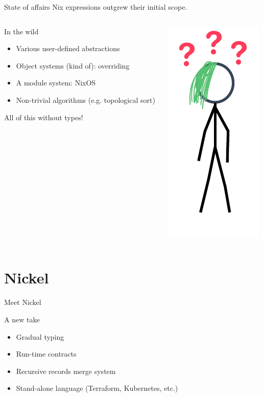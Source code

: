 \documentclass[aspectratio=169]{beamer}
\begin{document}
\begin{frame}{State of affairs}
    Nix expressions outgrew their initial scope.
    \begin{columns}
    \begin{column}{0.65\textwidth}
    \begin{exampleblock}{In the wild}
      \begin{itemize}
        \item Various user-defined abstractions
        \item Object systems (kind of): overriding
        \item A module system: NixOS
        \item Non-trivial algorithms (e.g. topological sort)
      \end{itemize}
    \end{exampleblock}
    All of this without types!
    \end{column}
    \begin{column}{0.30\textwidth}
        \includegraphics[height=0.7\textheight]{img/princess-comics-confused.pdf}
    \end{column}
\end{columns}
\end{frame}

\section{Nickel}

\begin{frame}{Meet Nickel}
    \begin{block}{A new take}
        \begin{itemize}
            \item Gradual typing
            \item Run-time contracts
            \item Recursive records merge system
            \item Stand-alone language (Terraform, Kubernetes, etc.)
        \end{itemize}
    \end{block}
\end{frame}
\end{document}
